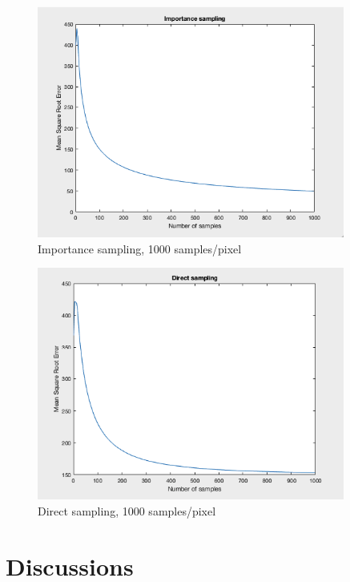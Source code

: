 \documentclass[10pt]{beamer}
\begin{document}
\begin{frame}
	\begin{figure}[H]
  \centering
    \includegraphics[width=0.9\textwidth]{importance_sampling.png}
    \caption{Importance sampling, 1000 samples/pixel}
\end{figure}
\end{frame}

\begin{frame}
	\begin{figure}[H]
  \centering
    \includegraphics[width=0.9\textwidth]{direct_sampling.png}
    \caption{Direct sampling, 1000 samples/pixel}
\end{figure}
\end{frame}

\section{Discussions}
\end{document}

